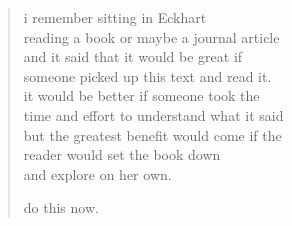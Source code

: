 
\begin{verse}
i remember sitting in Eckhart\\
reading a book or maybe a journal article\\
and it said that it would be great if\\
someone picked up this text and read it.\\
it would be better if someone took the \\
time and effort to understand what it said\\
but the greatest benefit would come if the\\
reader would set the book down \\
and explore on her own.

do this now.\\
\end{verse}

